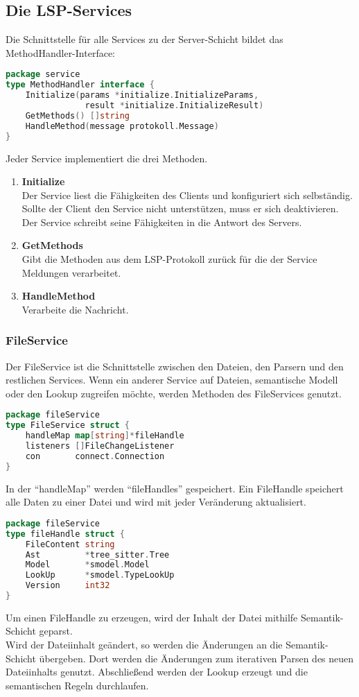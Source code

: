 \documentclass[./einleitung.tex]{subfiles}
\begin{document}
    \subsection{Die LSP-Services}
    Die Schnittstelle für alle Services zu der Server-Schicht bildet das MethodHandler-Interface:
    \begin{lstlisting}[language=Go]
package service
type MethodHandler interface {
	Initialize(params *initialize.InitializeParams,
                result *initialize.InitializeResult)
	GetMethods() []string
	HandleMethod(message protokoll.Message)
}
    \end{lstlisting}
    Jeder Service implementiert die drei Methoden.
    \begin{enumerate}
        \item \textbf{Initialize} \\
        Der Service liest die Fähigkeiten des Clients und konfiguriert sich selbständig.
        Sollte der Client den Service nicht unterstützen, muss er sich deaktivieren.
        Der Service schreibt seine Fähigkeiten in die Antwort des Servers.
        \item \textbf{GetMethods} \\
        Gibt die Methoden aus dem LSP-Protokoll zurück für die der Service Meldungen verarbeitet.
        \item \textbf{HandleMethod} \\
        Verarbeite die Nachricht.
    \end{enumerate}


    \subsubsection{FileService}
    Der FileService ist die Schnittstelle zwischen den Dateien, den Parsern und den restlichen Services.
    Wenn ein anderer Service auf Dateien, semantische Modell oder den Lookup zugreifen möchte, werden Methoden des FileServices genutzt.
    \begin{lstlisting}[language=Go]
package fileService
type FileService struct {
	handleMap map[string]*fileHandle
	listeners []FileChangeListener
	con       connect.Connection
}
    \end{lstlisting}
    In der ``handleMap'' werden ``fileHandles'' gespeichert.
    Ein FileHandle speichert alle Daten zu einer Datei und wird mit jeder Veränderung aktualisiert.
    \begin{lstlisting}[language=Go]
package fileService
type fileHandle struct {
	FileContent string
	Ast         *tree_sitter.Tree
	Model       *smodel.Model
	LookUp      *smodel.TypeLookUp
	Version     int32
}
    \end{lstlisting}
    Um einen FileHandle zu erzeugen, wird der Inhalt der Datei mithilfe Semantik-Schicht geparst.\\
    Wird der Dateiinhalt geändert, so werden die Änderungen an die Semantik-Schicht übergeben.
    Dort werden die Änderungen zum iterativen Parsen des neuen Dateiinhalts genutzt.
    Abschließend werden der Lookup erzeugt und die semantischen Regeln durchlaufen. \\
\end{document}
